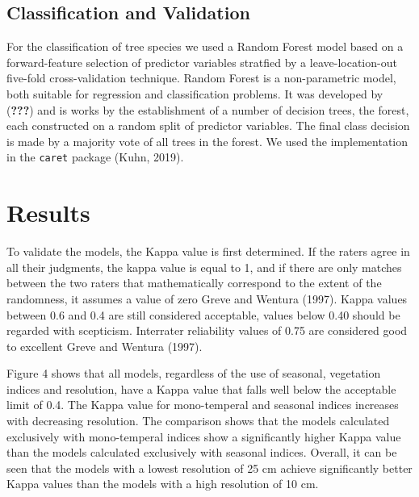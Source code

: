 \documentclass[]{article}
\begin{document}
\hypertarget{classification-and-validation}{%
\subsection{Classification and
Validation}\label{classification-and-validation}}

For the classification of tree species we used a Random Forest model
based on a forward-feature selection of predictor variables stratfied by
a leave-location-out five-fold cross-validation technique. Random Forest
is a non-parametric model, both suitable for regression and
classification problems. It was developed by ({\textbf{???}}) and is
works by the establishment of a number of decision trees, the forest,
each constructed on a random split of predictor variables. The final
class decision is made by a majority vote of all trees in the forest. We
used the implementation in the \texttt{caret} package (Kuhn, 2019).

\hypertarget{results}{%
\section{Results}\label{results}}

To validate the models, the Kappa value is first determined. If the
raters agree in all their judgments, the kappa value is equal to 1, and
if there are only matches between the two raters that mathematically
correspond to the extent of the randomness, it assumes a value of zero
Greve and Wentura (1997). Kappa values between 0.6 and 0.4 are still
considered acceptable, values below 0.40 should be regarded with
scepticism. Interrater reliability values of 0.75 are considered good to
excellent Greve and Wentura (1997).

Figure 4 shows that all models, regardless of the use of seasonal,
vegetation indices and resolution, have a Kappa value that falls well
below the acceptable limit of 0.4. The Kappa value for mono-temperal and
seasonal indices increases with decreasing resolution. The comparison
shows that the models calculated exclusively with mono-temperal indices
show a significantly higher Kappa value than the models calculated
exclusively with seasonal indices. Overall, it can be seen that the
models with a lowest resolution of 25 cm achieve significantly better
Kappa values than the models with a high resolution of 10 cm.
\end{document}
